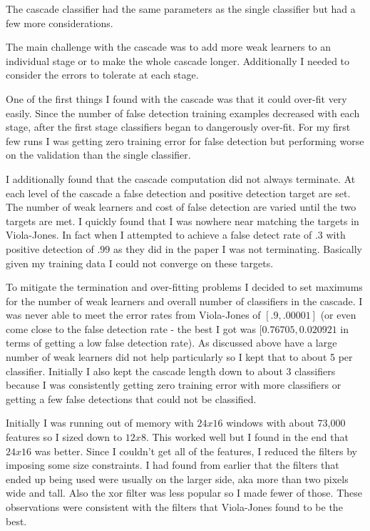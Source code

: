 \documentclass[letterpaper,12pt]{article}
\begin{document}
The cascade classifier had the same parameters as the single classifier but had a few more considerations.

The main challenge with the cascade was to add more weak learners to an individual stage or to make the whole cascade longer. Additionally I needed to consider the errors to tolerate at each stage.

One of the first things I found with the cascade was that it could over-fit very easily. Since the number of false detection training examples decreased with each stage, after the first stage classifiers began to dangerously over-fit. For my first few runs I was getting zero training error for false detection but performing worse on the validation than the single classifier.

I additionally found that the cascade computation did not always terminate. At each level of the cascade a false detection and positive detection target are set. The number of weak learners and cost of false detection are varied until the two targets are met. I quickly found that I was nowhere near matching the targets in Viola-Jones. In fact when I attempted to achieve a false detect rate of $.3$ with positive detection of $.99$ as they did in the paper I was not terminating. Basically given my training data I could not converge on these targets.

To mitigate the termination and over-fitting problems I decided to set maximums for the number of weak learners and overall number of classifiers in the cascade. I was never able to meet the error rates from Viola-Jones of $[.9,.00001]$ (or even come close to the false detection rate - the best I got was $[0.76705, 0.020921$ in terms of getting a low false detection rate). As discussed above have a large number of weak learners did not help particularly so I kept that to about 5 per classifier. Initially I also kept the cascade length down to about 3 classifiers because I was consistently getting zero training error with more classifiers or getting a few false detections that could not be classified.

Initially I was running out of memory with $24x16$ windows with about 73,000 features so I sized down to $12x8$. This worked well but I found in the end that $24x16$ was better. Since I couldn't get all of the features, I reduced the filters by imposing some size constraints. I had found from earlier that the filters that ended up being used were usually on the larger side, aka more than two pixels wide and tall. Also the xor filter was less popular so I made fewer of those. These observations were consistent with the filters that Viola-Jones found to be the best.
\end{document}
